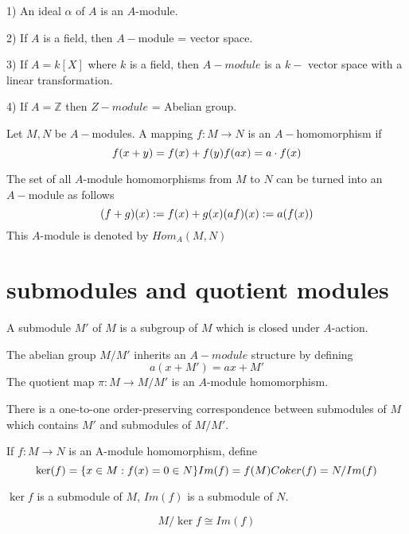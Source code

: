 \documentclass[11pt,fleqn]{book} %
\begin{document}
\begin{CJK}{UTF8}{gkai}
\begin{example}
	1) An ideal $\alpha$ of $A$ is an $A$-module.

	2) If $A$ is a field, then $A-$module = vector space.

	3) If $A=k[X]$ where $k$ is a field, then $A-module$ is a $k-$ vector space with a linear transformation.

	4) If $A = \mathbb{Z}$ then $Z-module$ = Abelian group.
\end{example}

\begin{definition}
	 Let $M, N$ be $A-$modules. A mapping $f:M \to N$ is an $A-$homomorphism if 
	\[
		f(x+y) = f(x) + f(y) \\
		f(ax) = a\cdot f(x)\]
\end{definition}

\begin{definition}
	The set of all $A$-module homomorphisms from $M$ to $N$ can be turned into an $A-$module as follows \[
		(f+g)(x) := f(x) + g(x) \\
		(af)(x) := a(f(x))\]
	This $A$-module is denoted by $Hom_A(M, N)$
\end{definition}

\section{submodules and quotient modules}
\begin{definition}
	A submodule $M'$ of $M$ is a subgroup of $M$ which is closed under $A$-action.
\end{definition}

\begin{definition}
	[quotient] The abelian group $M/M'$ inherits an $A-module$ structure by defining 
	\[
		a(x + M') = ax + M'\]
	The quotient map $\pi: M \to M/M'$ is an $A$-module homomorphism.
\end{definition}

\begin{proposition}
	 There is a one-to-one order-preserving correspondence between submodules of $M$ which contains $M'$ and submodules of $M/M'$.
\end{proposition}

\begin{definition}
	 If $f:M\to N$ is an A-module homomorphism, define 
	\[
		\ker(f) = \{x\in M: f(x) = 0\in N\}\\
		Im(f) = f(M)\\
		Coker (f) = N/Im(f)\]
\end{definition}
\begin{proposition}
	$\ker f$ is a submodule of $M$, $Im(f)$ is a submodule of $N$.
\end{proposition}
\begin{proposition}
	\[
		M/\ker f \cong Im(f)\]
\end{proposition}


\end{CJK}
\end{document}
